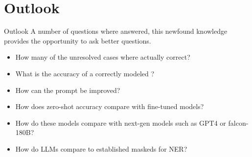 \section{Outlook}

\begin{frame}[c]{Outlook}
    \large
    A number of questions where answered, this newfound knowledge provides the opportunity to ask better questions.
    \begin{itemize}[<+(1)->]
        \item How many of the unresolved \tsolv cases where actually correct?
        \item What is the accuracy of a correctly modeled \tadd?
        \item How can the prompt be improved?
        \item How does zero-shot accuracy compare with fine-tuned models?
        \item How do these models compare with next-gen models such as \gls{GPT4} or \gls{falcon}-180B?
        \item How do \glspl{LLM} compare to established \glspl{masked} for \gls{NER}?
    \end{itemize}
\end{frame}
